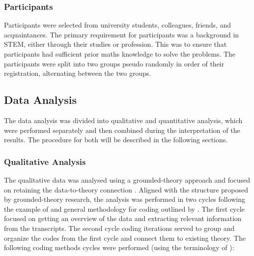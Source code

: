 \subsubsection{Participants} \label{sssec:participants}

Participants were selected from university students, colleagues, friends, and acquaintances. The primary requirement for participants was a background in \ac{STEM}, either through their studies or profession. This was to ensure that participants had sufficient prior maths knowledge to solve the problems. The participants were split into two groups pseudo randomly in order of their registration, alternating between the two groups.

\subsection{Data Analysis} \label{ssec:data_analysis}

The data analysis was divided into qualitative and quantitative analysis, which were performed separately and then combined during the interpretation of the results. The procedure for both will be described in the following sections.

\subsubsection{Qualitative Analysis} \label{sssec:qualitative_analysis}

The qualitative data was analysed using a grounded-theory approach and focused on retaining the data-to-theory connection \parencite{Gioia2021}. Aligned with the structure proposed by grounded-theory research, the analysis was performed in two cycles following the example of \textcite{Jussupow2021} and general methodology for coding outlined by \textcite{Saldana2015}. The first cycle focused on getting an overview of the data and extracting relevant information from the transcripts. The second cycle coding iterations served to group and organize the codes from the first cycle and connect them to existing theory. The following coding methods cycles were performed (using the terminology of \textcite{Saldana2015}):

